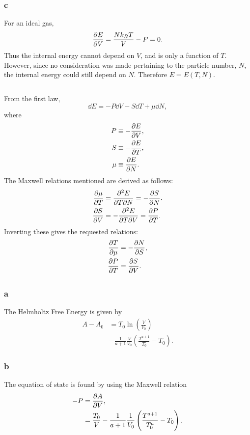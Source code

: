 \documentclass[a4paper,12pt,twoside]{article}
\begin{document}
\begin{multicols*}{2}
\subsubsection*{c}
For an ideal gas,
\begin{equation}
	\pdv{E}{V} = \frac{Nk_BT}{V} - P = 0.
\end{equation}
Thus the internal energy cannot depend on $V$, and is only a function of $T$.
However, since no consideration was made pertaining to the particle number, $N$, the internal energy could still depend on $N$.
Therefore $E = E(T,N)$.
\subsection{}%
From the first law,
\begin{equation}
	\dd{E} = -P\dd{V} - S\dd{T} + \mu \dd{N},
\end{equation}
where
\begin{align}
	P   &\equiv -\pdv{E}{V},\\
	S   &\equiv -\pdv{E}{T},\\
	\mu &\equiv  \pdv{E}{N}.
\end{align}
The Maxwell relations mentioned are derived as follows:
\begin{align}
	\pdv{\mu}{T} &= \pdv{E}{T}{N} = -\pdv{S}{N}.\\
	\pdv{S}{V} &= -\pdv{E}{T}{V} = \pdv{P}{T}.
\end{align}
Inverting these gives the requested relations:
\begin{align}
	\pdv{T}{\mu} &= -\pdv{N}{S},\\
	\pdv{P}{T} &=\pdv{S}{V}.
\end{align}
\subsection{}%
\subsubsection*{a}
The Helmholtz Free Energy is given by
\begin{align}
	A-A_0 &= T_0 \ln(\frac{V}{V_0}) \nonumber \\
	&-\frac{1}{a+1} \frac{V}{V_0}\left( \frac{T^{a+1}}{T_0^{a}} - T_0 \right).
\end{align}
\subsubsection*{b}
The equation of state is found by using the Maxwell relation
\begin{align}
	-P &= \pdv{A}{V},\\
	&= \frac{T_0}{V} - \frac{1}{a+1} \frac{1}{V_0}\left( \frac{T^{a+1}}{T_0^{a}} - T_0 \right).
	\label{eq: 4b_answer}
\end{align}


\end{multicols*}
\end{document}
